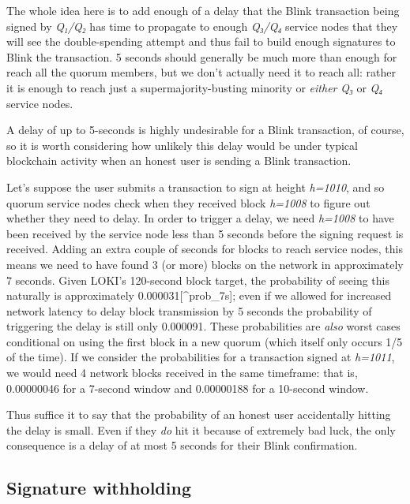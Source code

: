 The whole idea here is to add enough of a delay that the Blink
transaction being signed by \emph{Q₁/Q₂} has time to propagate to enough
\emph{Q₃/Q₄} service nodes that they will see the double-spending
attempt and thus fail to build enough signatures to Blink the
transaction. 5 seconds should generally be much more than enough for
reach all the quorum members, but we don't actually need it to reach
all: rather it is enough to reach just a supermajority-busting minority
or \emph{either} \emph{Q₃} or \emph{Q₄} service nodes.

A delay of up to 5-seconds is highly undesirable for a Blink
transaction, of course, so it is worth considering how unlikely this
delay would be under typical blockchain activity when an honest user is
sending a Blink transaction.

Let's suppose the user submits a transaction to sign at height
\emph{h=1010}, and so quorum service nodes check when they received
block \emph{h=1008} to figure out whether they need to delay. In order
to trigger a delay, we need \emph{h=1008} to have been received by the
service node less than 5 seconds before the signing request is received.
Adding an extra couple of seconds for blocks to reach service nodes,
this means we need to have found 3 (or more) blocks on the network in
approximately 7 seconds. Given LOKI's 120-second block target, the
probability of seeing this naturally is approximately
0.000031{[}\^{}prob\_7s{]}; even if we allowed for increased network
latency to delay block transmission by 5 seconds the probability of
triggering the delay is still only 0.000091. These probabilities are
\emph{also} worst cases conditional on using the first block in a new
quorum (which itself only occurs 1/5 of the time). If we consider the
probabilities for a transaction signed at \emph{h=1011}, we would need 4
network blocks received in the same timeframe: that is, 0.00000046 for a
7-second window and 0.00000188 for a 10-second window.

Thus suffice it to say that the probability of an honest user
accidentally hitting the delay is small. Even if they \emph{do} hit it
because of extremely bad luck, the only consequence is a delay of at
most 5 seconds for their Blink confirmation.

\hypertarget{signature-withholding}{%
\subsection{Signature withholding}\label{signature-withholding}}

